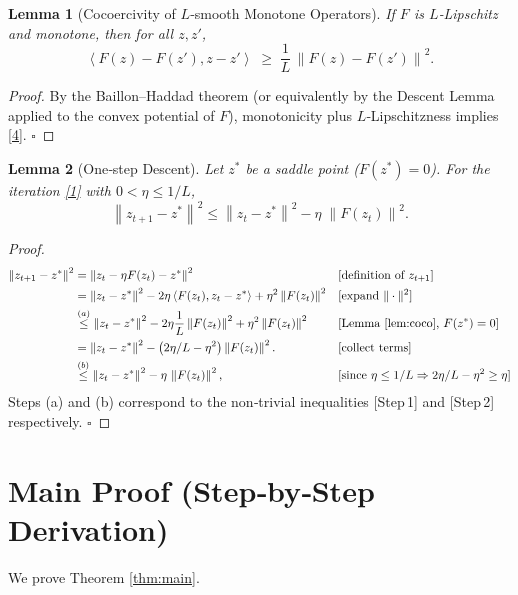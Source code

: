 \documentclass{article}
\newtheorem{lemma}{Lemma}
\newcommand{\norm}[1]{\left\|#1\right\|}
\newcommand{\inner}[2]{\left\langle #1,#2 \right\rangle}
\begin{document}
\begin{lemma}[Cocoercivity of $L$‑smooth Monotone Operators]\label{lem:coco}
If $F$ is $L$‑Lipschitz and monotone, then for all $z,z'$,
\[
\inner{F(z)-F(z')}{z-z'}\;\ge\;\frac{1}{L}\,\norm{F(z)-F(z')}^{2}.
\tag{4}
\]
\end{lemma}
\begin{proof}
By the Baillon–Haddad theorem (or equivalently by the Descent Lemma applied to the convex potential of $F$), monotonicity plus $L$‑Lipschitzness implies \eqref{4}. \hfill $\square$
\end{proof}

\begin{lemma}[One‑step Descent]\label{lem:descent}
Let $z^{*}$ be a saddle point ($F(z^{*})=0$). For the iteration \eqref{1} with $0<\eta\le 1/L$,
\[
\norm{z_{t+1}-z^{*}}^{2}
\le
\norm{z_{t}-z^{*}}^{2}
-\eta\;\norm{F(z_{t})}^{2}.
\tag{5}
\]
\end{lemma}
\begin{proof}
\[
\begin{aligned}
\norm{z_{t+1}-z^{*}}^{2}
&=\norm{z_{t}-\eta F(z_{t})-z^{*}}^{2}                                      &&\text{[definition of $z_{t+1}$]}\\
&=\norm{z_{t}-z^{*}}^{2}
   -2\eta\inner{F(z_{t})}{z_{t}-z^{*}}
   +\eta^{2}\norm{F(z_{t})}^{2}                                            &&\text{[expand $\|\cdot\|^{2}$]}\\
&\overset{(a)}{\le}
   \norm{z_{t}-z^{*}}^{2}
   -2\eta\frac{1}{L}\norm{F(z_{t})}^{2}
   +\eta^{2}\norm{F(z_{t})}^{2}                                            &&\text{[Lemma \ref{lem:coco}, $F(z^{*})=0$]}\\
&=\norm{z_{t}-z^{*}}^{2}
   -\bigl(2\eta/L-\eta^{2}\bigr)\norm{F(z_{t})}^{2}.                         &&\text{[collect terms]}\\
&\overset{(b)}{\le}
   \norm{z_{t}-z^{*}}^{2}
   -\eta\,\norm{F(z_{t})}^{2},                                            &&\text{[since $\eta\le1/L\Rightarrow 2\eta/L-\eta^{2}\ge\eta$]}\\
\end{aligned}
\]
Steps (a) and (b) correspond to the non‑trivial inequalities [Step 1] and [Step 2] respectively. \hfill $\square$
\end{proof}

\section*{Main Proof (Step‑by‑Step Derivation)}
We prove Theorem \ref{thm:main}.
\end{document}
